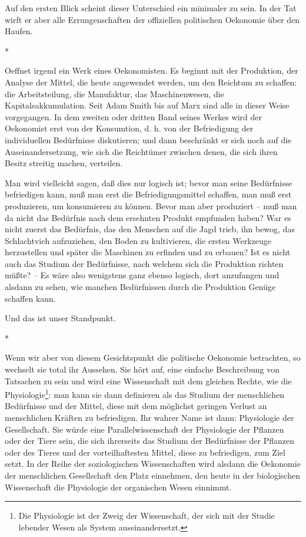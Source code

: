 \documentclass{scrbook}
\begin{document}
Auf den ersten Blick scheint dieser Unterschied ein minimaler zu sein. In der Tat wirft er aber alle Errungenschaften der offiziellen politischen Oekonomie über den Haufen.

\begin{center}*\end{center}

Oeffnet irgend ein Werk eines Oekonomisten. Es beginnt mit der Produktion, der Analyse der Mittel, die heute angewendet werden, um den Reichtum zu schaffen: die Arbeitsteilung, die Manufaktur, das Maschinenwesen, die Kapitalsakkumulation. Seit Adam Smith bis auf Marx sind alle in dieser Weise vorgegangen. In dem zweiten oder dritten Band seines Werkes wird der Oekonomist erst von der Konsumtion, d. h. von der Befriedigung der individuellen Bedürfnisse diskutieren; und dann beschränkt er sich noch auf die Auseinandersetzung, wie sich die Reichtümer zwischen denen, die sich ihren Besitz streitig machen, verteilen.

Man wird vielleicht sagen, daß dies nur logisch ist; bevor man seine Bedürfnisse befriedigen kann, muß man erst die Befriedigungsmittel schaffen, man muß erst produzieren, um konsumieren zu können. Bevor man aber produziert – muß man da nicht das Bedürfnis nach dem ersehnten Produkt empfunden haben? War es nicht zuerst das Bedürfnis, das den Menschen auf die Jagd trieb, ihn bewog, das Schlachtvieh aufzuziehen, den Boden zu kultivieren, die ersten Werkzeuge herzustellen und später die Maschinen zu erfinden und zu erbauen? Ist es nicht auch das Studium der Bedürfnisse, nach welchem sich die Produktion richten müßte? – Es wäre also wenigstens ganz ebenso logisch, dort anzufangen und alsdann zu sehen, wie manchen Bedürfnissen durch die Produktion Genüge schaffen kann.

Und das ist unser Standpunkt.

\begin{center}*\end{center}

Wenn wir aber von diesem Gesichtspunkt die politische Oekonomie betrachten, so wechselt sie total ihr Aussehen. Sie hört auf, eine einfache Beschreibung von Tatsachen zu sein und wird eine Wissenschaft mit dem gleichen Rechte, wie die Physiologie\footnote{Die Physiologie ist der Zweig der Wissenschaft, der sich mit der Studie lebender Wesen als System auseinandersetzt.}: man kann sie dann definieren als das Studium der menschlichen Bedürfnisse und der Mittel, diese mit dem möglichst geringen Verlust an menschlichen Kräften zu befriedigen. Ihr wahrer Name ist dann: Physiologie der Gesellschaft. Sie würde eine Parallelwissenschaft der Physiologie der Pflanzen oder der Tiere sein, die sich ihrerseits das Studium der Bedürfnisse der Pflanzen oder des Tieres und der vorteilhaftesten Mittel, diese zu befriedigen, zum Ziel setzt. In der Reihe der soziologischen Wissenschaften wird alsdann die Oekonomie der menschlichen Gesellschaft den Platz einnehmen, den heute in der biologischen Wissenschaft die Physiologie der organischen Wesen einnimmt.
\end{document}
